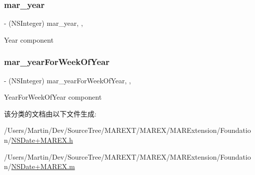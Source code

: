 \subsubsection{\texorpdfstring{mar\+\_\+year}{mar\_year}}
{\footnotesize\ttfamily -\/ (N\+S\+Integer) mar\+\_\+year\hspace{0.3cm}{\ttfamily [read]}, {\ttfamily [nonatomic]}, {\ttfamily [assign]}}



Year component 

\mbox{\label{category_n_s_date_07_m_a_r_e_x_08_a87e7ddbe473e203254659abdceee4553}} 
\subsubsection{\texorpdfstring{mar\+\_\+year\+For\+Week\+Of\+Year}{mar\_yearForWeekOfYear}}
{\footnotesize\ttfamily -\/ (N\+S\+Integer) mar\+\_\+year\+For\+Week\+Of\+Year\hspace{0.3cm}{\ttfamily [read]}, {\ttfamily [nonatomic]}, {\ttfamily [assign]}}



Year\+For\+Week\+Of\+Year component 



该分类的文档由以下文件生成\+:\begin{DoxyCompactItemize}
\item 
/\+Users/\+Martin/\+Dev/\+Source\+Tree/\+M\+A\+R\+E\+X\+T/\+M\+A\+R\+E\+X/\+M\+A\+R\+Extension/\+Foundation/\hyperlink{_n_s_date_09_m_a_r_e_x_8h}{N\+S\+Date+\+M\+A\+R\+E\+X.\+h}\item 
/\+Users/\+Martin/\+Dev/\+Source\+Tree/\+M\+A\+R\+E\+X\+T/\+M\+A\+R\+E\+X/\+M\+A\+R\+Extension/\+Foundation/\hyperlink{_n_s_date_09_m_a_r_e_x_8m}{N\+S\+Date+\+M\+A\+R\+E\+X.\+m}\end{DoxyCompactItemize}
